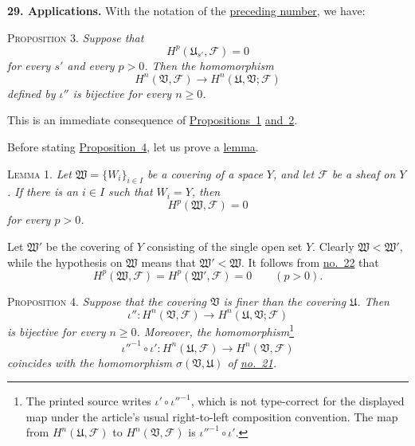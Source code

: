 
\medskip
{}\label{fac:I:4:no:29}
\textbf{29. Applications.}
With the notation of the \hyperref[fac:I:4:no:28]{preceding number}, we have:

\label{fac:I:4:no:29:prop:3}
\textsc{Proposition 3.} \textit{Suppose that}
\[
H^p(\mathfrak{U}_{s'},\mathcal{F})=0
\]
\textit{for every $s'$ and every $p>0$. Then the homomorphism}
\[
H^n(\mathfrak{V},\mathcal{F})
\longrightarrow H^n(\mathfrak{U},\mathfrak{V};\mathcal{F})
\]
\textit{defined by $\iota''$ is bijective for every $n\geq0$.}

This is an immediate consequence of \hyperref[fac:I:4:no:27:prop:1]{Propositions~1} \hyperref[fac:I:4:no:28:prop:2]{and~2}.

Before stating \hyperref[fac:I:4:no:29:prop:4]{Proposition~4}, let us prove a \hyperref[fac:I:4:no:29:lemma:1]{lemma}.

\label{fac:I:4:no:29:lemma:1}
\textsc{Lemma 1.} \textit{Let $\mathfrak{W}=\{W_i\}_{i\in I}$ be a covering of a space $Y$, and let $\mathcal{F}$ be a sheaf on $Y$. If there is an $i\in I$ such that $W_i=Y$, then}
\[
H^p(\mathfrak{W},\mathcal{F})=0
\]
\textit{for every $p>0$.}

Let $\mathfrak{W}'$ be the covering of $Y$ consisting of the single open set $Y$. Clearly $\mathfrak{W}<\mathfrak{W}'$, while the hypothesis on $\mathfrak{W}$ means that $\mathfrak{W}'<\mathfrak{W}$. It follows from \hyperref[fac:I:3:no:22]{no.~22} that
\[
H^p(\mathfrak{W},\mathcal{F})
=H^p(\mathfrak{W}',\mathcal{F})=0
\qquad(p>0).
\]

\label{fac:I:4:no:29:prop:4}
\textsc{Proposition 4.} \textit{Suppose that the covering $\mathfrak{V}$ is finer than the covering $\mathfrak{U}$. Then}
\[
\iota'':H^n(\mathfrak{V},\mathcal{F})
\longrightarrow H^n(\mathfrak{U},\mathfrak{V};\mathcal{F})
\]
\textit{is bijective for every $n\geq0$. Moreover, the homomorphism}\footnote{The printed source writes $\iota'\circ\iota''^{-1}$, which is not type-correct for the displayed map under the article's usual right-to-left composition convention. The map from $H^n(\mathfrak U,\mathcal F)$ to $H^n(\mathfrak V,\mathcal F)$ is $\iota''^{-1}\circ\iota'$.}
\[
\iota''^{-1}\circ\iota':
H^n(\mathfrak{U},\mathcal{F})
\longrightarrow H^n(\mathfrak{V},\mathcal{F})
\]
\textit{coincides with the homomorphism $\sigma(\mathfrak{V},\mathfrak{U})$ of \hyperref[fac:I:3:no:21]{no.~21}.}

